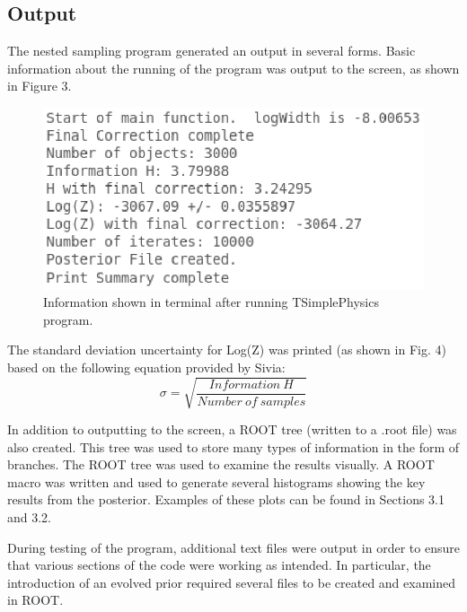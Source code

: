 \documentclass[a4paper,12pt]{article}
\begin{document}

\subsection{Output}
The nested sampling program generated an output in several forms.  Basic information about the running of the program was output to the screen, as shown in Figure 3.

\begin{figure}[!h]
 \begin{center}
  \includegraphics[scale=0.8]{term_output.eps}
  \caption{Information shown in terminal after running TSimplePhysics program.}
 \end{center}
\end{figure}

The standard deviation uncertainty for Log(Z) was printed (as shown in Fig. 4) based on the following equation provided by Sivia\cite{sivia}:
\begin{equation}
 \sigma = \sqrt{\frac{Information\  H}{Number\  of\  samples}}
\end{equation}


In addition to outputting to the screen, a ROOT tree (written to a .root file) was also created.  This tree was used to store many types of information in the form of branches.  The ROOT tree was used to examine the results visually.  A ROOT macro was written and used to generate several histograms showing the key results from the posterior.  Examples of these plots can be found in Sections 3.1 and 3.2.


During testing of the program, additional text files were output in order to ensure that various sections of the code were working as intended.  In particular, the introduction of an evolved prior required several files to be created and examined in ROOT.
\end{document}
